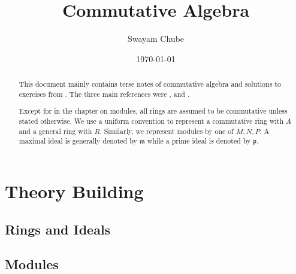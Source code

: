 \documentclass{report}
\title{Commutative Algebra}
\author{Swayam Chube}
\date{\today}
\begin{document}
\maketitle

\begin{abstract}
This document mainly contains terse notes of commutative algebra and solutions to exercises from \cite{atiyah-macdonald}. The three main references were \cite{atiyah-macdonald}, \cite{dummit-foote} and \cite{lang}. 

Except for in the chapter on modules, all rings are assumed to be commutative unless stated otherwise. We use a uniform convention to represent a commutative ring with $A$ and a general ring with $R$. Similarly, we represent modules by one of $M, N, P$. A maximal ideal is generally denoted by $\mathfrak m$ while a prime ideal is denoted by $\mathfrak p$.
\end{abstract}

\tableofcontents


\part{Theory Building}
\chapter{Rings and Ideals}


\chapter{Modules}


% 



\end{document}
